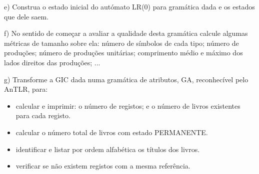 e) Construa o estado inicial do autómato LR(0) para gramática dada e os estados que dele saem.

f) No sentido de começar a avaliar a qualidade desta gramática calcule algumas métricas de tamanho
sobre ela: número de símbolos de cada tipo; número de produções; número de produções unitárias;
comprimento médio e máximo dos lados direitos das produções; ...

g) Transforme a GIC dada numa gramática de atributos, GA, reconhecível pelo AnTLR, para:
\begin{itemize}
\item calcular e imprimir: o número de registos; e o número de livros existentes para cada registo.
\item calcular o número total de livros com estado PERMANENTE.
\item identificar e listar por ordem alfabética os títulos dos livros.
\item verificar se não existem registos com a mesma referência.
\end{itemize}

\newpage